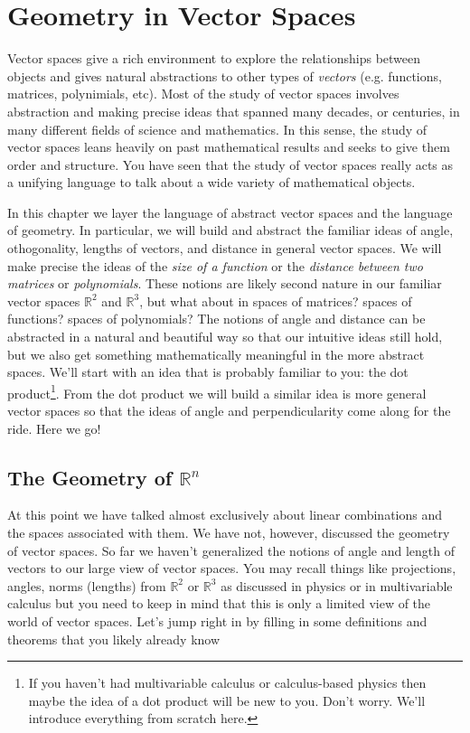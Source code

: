 \chapter{Geometry in Vector Spaces}
Vector spaces give a rich environment to explore the relationships between 
objects and gives natural abstractions to other types of {\it vectors} (e.g. functions,
matrices, polynimials, etc).  Most of the study of vector spaces involves abstraction
and making precise ideas that spanned many decades, or centuries, in many different fields
of science and mathematics.  In this sense, the study of vector spaces leans heavily on
past mathematical results and seeks to give them order and structure.  You
have seen that the study of vector spaces really acts as a unifying language to talk about
a wide variety of mathematical objects.

In this chapter we layer the language of abstract vector spaces and the language of
geometry.  In particular, we will build and abstract the familiar ideas of angle,
othogonality, lengths of vectors, and distance in general vector spaces.  We will make
precise the ideas of the {\it size of a function} or the {\it distance between two
matrices} or {\it polynomials}.  These notions are likely second nature in our familiar
vector spaces 
$\mathbb{R}^2$ and $\mathbb{R}^3$, but what about in spaces of matrices? spaces of
functions? spaces of polynomials?  The notions of angle and  distance can be abstracted in
a natural and beautiful way so that our intuitive ideas still hold, but we also get
something mathematically meaningful in the more abstract spaces.  We'll start with an idea
that is probably familiar to you: the dot product\footnote{If you haven't had
multivariable calculus or calculus-based physics then maybe the idea of a dot product will
be new to you.  Don't worry.  We'll introduce everything from scratch here.}.  From the
dot product we will build a similar idea is more general vector spaces so that the ideas
of angle and perpendicularity come along for the ride.  Here we go!

\section{The Geometry of $\mathbb{R}^n$}
At this point we have talked almost exclusively about linear combinations and the spaces
associated with them.  We have not, however, discussed the geometry of vector spaces.  So
far we haven't generalized the notions of angle and length of vectors to our large view of
vector spaces.  You may recall things like projections, angles, norms (lengths) from
$\mathbb{R}^2$ or $\mathbb{R}^3$ as discussed in physics or in multivariable calculus but
you need to keep in mind that this is only a limited view of the world of vector spaces.
Let's jump right in by filling in some definitions and theorems that you likely already
know


